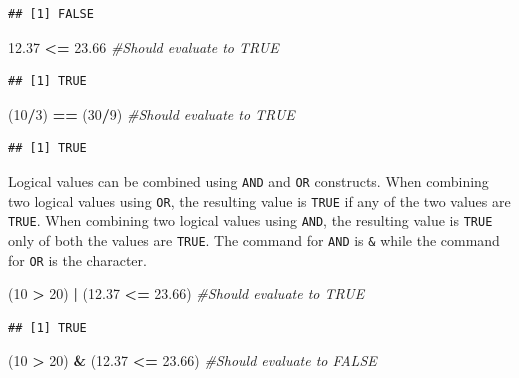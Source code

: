 \documentclass[]{krantz}
\makeatletter
\newenvironment{Shaded}{\begin{snugshade}}{\end{snugshade}}
\newcommand{\DecValTok}[1]{\textcolor[rgb]{0.06,0.06,0.06}{#1}}
\newcommand{\FloatTok}[1]{\textcolor[rgb]{0.06,0.06,0.06}{#1}}
\newcommand{\StringTok}[1]{\textcolor[rgb]{0.5,0.5,0.5}{#1}}
\newcommand{\CommentTok}[1]{\textcolor[rgb]{0.56,0.35,0.01}{\textit{#1}}}
\newcommand{\OperatorTok}[1]{\textcolor[rgb]{0.81,0.36,0.00}{\textbf{#1}}}
\newcommand{\NormalTok}[1]{#1}
\newenvironment{kframe}{%
\medskip{}
\setlength{\fboxsep}{.8em}
 \def\at@end@of@kframe{}%
 \ifinner\ifhmode%
  \def\at@end@of@kframe{\end{minipage}}%
  \begin{minipage}{\columnwidth}%
 \fi\fi%
 \def\FrameCommand##1{\hskip\@totalleftmargin \hskip-\fboxsep
 \colorbox{shadecolor}{##1}\hskip-\fboxsep
     \hskip-\linewidth \hskip-\@totalleftmargin \hskip\columnwidth}%
 \MakeFramed {\advance\hsize-\width
   \@totalleftmargin\z@ \linewidth\hsize
   \@setminipage}}%
 {\par\unskip\endMakeFramed%
 \at@end@of@kframe}
\renewenvironment{Shaded}{\begin{kframe}}{\end{kframe}}
\theoremstyle{definition}
\theoremstyle{definition}
\theoremstyle{definition}
\theoremstyle{remark}
\makeatother
\begin{document}
\begin{verbatim}
## [1] FALSE
\end{verbatim}

\begin{Shaded}
\begin{Highlighting}[]
\FloatTok{12.37} \OperatorTok{<=}\StringTok{ }\FloatTok{23.66} \CommentTok{#Should evaluate to TRUE}
\end{Highlighting}
\end{Shaded}

\begin{verbatim}
## [1] TRUE
\end{verbatim}

\begin{Shaded}
\begin{Highlighting}[]
\NormalTok{(}\DecValTok{10}\OperatorTok{/}\DecValTok{3}\NormalTok{) }\OperatorTok{==}\StringTok{ }\NormalTok{(}\DecValTok{30}\OperatorTok{/}\DecValTok{9}\NormalTok{) }\CommentTok{#Should evaluate to TRUE}
\end{Highlighting}
\end{Shaded}

\begin{verbatim}
## [1] TRUE
\end{verbatim}

Logical values can be combined using \texttt{AND} and \texttt{OR}
constructs. When combining two logical values using \texttt{OR}, the
resulting value is \texttt{TRUE} if any of the two values are
\texttt{TRUE}. When combining two logical values using \texttt{AND}, the
resulting value is \texttt{TRUE} only of both the values are
\texttt{TRUE}. The command for \texttt{AND} is \texttt{\&} while the
command for \texttt{OR} is the \texttt{\textbar{}} character.

\begin{Shaded}
\begin{Highlighting}[]
\NormalTok{(}\DecValTok{10} \OperatorTok{>}\StringTok{ }\DecValTok{20}\NormalTok{) }\OperatorTok{|}\StringTok{ }\NormalTok{(}\FloatTok{12.37} \OperatorTok{<=}\StringTok{ }\FloatTok{23.66}\NormalTok{) }\CommentTok{#Should evaluate to TRUE}
\end{Highlighting}
\end{Shaded}

\begin{verbatim}
## [1] TRUE
\end{verbatim}

\begin{Shaded}
\begin{Highlighting}[]
\NormalTok{(}\DecValTok{10} \OperatorTok{>}\StringTok{ }\DecValTok{20}\NormalTok{) }\OperatorTok{&}\StringTok{ }\NormalTok{(}\FloatTok{12.37} \OperatorTok{<=}\StringTok{ }\FloatTok{23.66}\NormalTok{) }\CommentTok{#Should evaluate to FALSE}
\end{Highlighting}
\end{Shaded}
\end{document}
